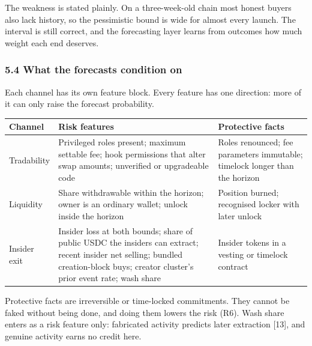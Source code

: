 The weakness is stated plainly. On a three-week-old chain most honest buyers also lack history, so the pessimistic bound is wide for almost every launch. The interval is still correct, and the forecasting layer learns from outcomes how much weight each end deserves.

\subsubsection{5.4 What the forecasts condition on}\label{what-the-forecasts-condition-on}

Each channel has its own feature block. Every feature has one direction: more of it can only raise the forecast probability.

{\def\LTcaptype{none} %
\begin{longtable}[]{@{}
  >{\raggedright\arraybackslash}p{}
  >{\raggedright\arraybackslash}p{}
  >{\raggedright\arraybackslash}p{}@{}}
\toprule\noalign{}
\begin{minipage}[b]{\linewidth}\raggedright
Channel
\end{minipage} & \begin{minipage}[b]{\linewidth}\raggedright
Risk features
\end{minipage} & \begin{minipage}[b]{\linewidth}\raggedright
Protective facts
\end{minipage} \\
\midrule\noalign{}
\endhead
\bottomrule\noalign{}
\endlastfoot
Tradability & Privileged roles present; maximum settable fee; hook permissions that alter swap amounts; unverified or upgradeable code & Roles renounced; fee parameters immutable; timelock longer than the horizon \\
Liquidity & Share withdrawable within the horizon; owner is an ordinary wallet; unlock inside the horizon & Position burned; recognised locker with later unlock \\
Insider exit & Insider loss at both bounds; share of public USDC the insiders can extract; recent insider net selling; bundled creation-block buys; creator cluster's prior event rate; wash share & Insider tokens in a vesting or timelock contract \\
\end{longtable}
}

Protective facts are irreversible or time-locked commitments. They cannot be faked without being done, and doing them lowers the risk (R6). Wash share enters as a risk feature only: fabricated activity predicts later extraction {[}13{]}, and genuine activity earns no credit here.

